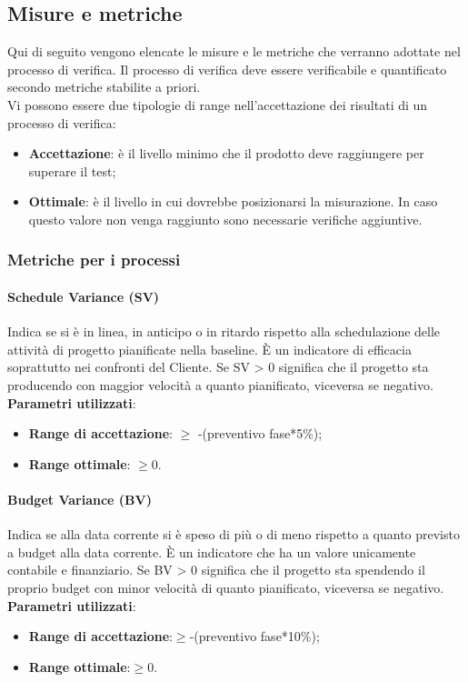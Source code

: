 \documentclass[12pt,a4paper,titlepage]{article}
\begin{document}
	\subsection{Misure e metriche}
	\label{MisureMetriche}
	Qui di seguito vengono elencate le misure e le metriche che verranno adottate nel processo di verifica. Il processo di verifica deve essere verificabile e quantificato secondo metriche stabilite a priori.\\
	Vi possono essere due tipologie di range nell'accettazione dei risultati di un processo di verifica:
	\begin{itemize}
		\item \textbf{Accettazione}: è il livello minimo che il prodotto deve raggiungere per superare il test;
		\item \textbf{Ottimale}: è il livello in cui dovrebbe posizionarsi la misurazione. In caso questo valore non venga raggiunto sono necessarie verifiche aggiuntive.
	\end{itemize}

		\subsubsection{Metriche per i processi}
			\paragraph{Schedule Variance (SV)}
			Indica se si è in linea, in anticipo o in ritardo rispetto alla schedulazione delle attività di progetto pianificate nella baseline. È un indicatore di efficacia soprattutto nei confronti del Cliente. Se SV > 0 significa che il progetto sta producendo con maggior velocità a quanto pianificato, viceversa se negativo.\\
			\textbf{Parametri utilizzati}:
			\begin{itemize}
				\item \textbf{Range di accettazione}: $\geq$ -(preventivo fase*5\%);
				\item \textbf{Range ottimale}: $\geq0$.
			\end{itemize}
		
			\paragraph{Budget Variance (BV)}
			Indica se alla data corrente si è speso di più o di meno rispetto a quanto previsto a budget alla data corrente. È un indicatore che ha un valore unicamente contabile e finanziario. Se BV > 0 significa che il progetto sta spendendo il proprio budget con minor velocità di quanto pianificato, viceversa se negativo. \\
			\textbf{Parametri utilizzati}:
			\begin{itemize}
				\item \textbf{Range di accettazione}:$\geq$-(preventivo fase*10\%);
				\item \textbf{Range ottimale}:$\geq0$.
			\end{itemize}
		
\end{document}
